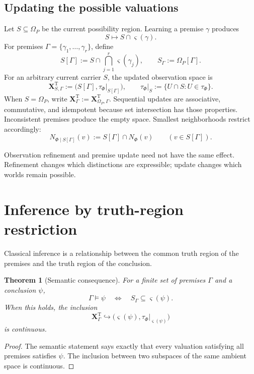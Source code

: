 \documentclass[11pt]{article}
\theoremstyle{definition}
\theoremstyle{plain}
\newtheorem{theorem}[definition]{Theorem}
\theoremstyle{remark}
\newcommand{\True}{\mathrm{T}}
\newcommand{\restr}{\mathord{|}}
\begin{document}
\subsection{Updating the possible valuations}

Let $S\subseteq\Omega_P$ be the current possibility region.  Learning a
premise $\gamma$ produces
\[
 S\longmapsto S\cap\varsigma(\gamma).
\]
For premises $\Gamma=\{\gamma_1,\ldots,\gamma_r\}$, define
\[
 S[\Gamma]:=S\cap\bigcap_{j=1}^r\varsigma(\gamma_j),
 \qquad
 S_\Gamma:=\Omega_P[\Gamma].
\]
For an arbitrary current carrier $S$, the updated observation space is
\[
 \mathbf X^\True_{S,\Gamma}
 :=\bigl(S[\Gamma],\tau_\Phi\restr_{S[\Gamma]}\bigr),
 \qquad
 \tau_\Phi\restr_S:=\{U\cap S:U\in\tau_\Phi\}.
\]
When $S=\Omega_P$, write
$\mathbf X^\True_\Gamma:=\mathbf X^\True_{\Omega_P,\Gamma}$.
Sequential updates are associative, commutative, and idempotent because set
intersection has those properties.  Inconsistent premises produce the empty
space.  Smallest neighborhoods restrict accordingly:
\[
 N_{\Phi\mid S[\Gamma]}(v):=S[\Gamma]\cap N_\Phi(v)
 \qquad(v\in S[\Gamma]).
\]

Observation refinement and premise update need not have the same effect.
Refinement changes which distinctions are expressible; update changes which
worlds remain possible.

\section{Inference by truth-region restriction}

Classical inference is a relationship between the common truth region of the
premises and the truth region of the conclusion.

\begin{theorem}[Semantic consequence]
For a finite set of premises $\Gamma$ and a conclusion $\psi$,
\[
 \Gamma\models\psi
 \quad\Longleftrightarrow\quad
 S_\Gamma\subseteq\varsigma(\psi).
\]
When this holds, the inclusion
\[
 \mathbf X^\True_\Gamma
 \hookrightarrow
 \bigl(\varsigma(\psi),
       \tau_\Phi\restr_{\varsigma(\psi)}\bigr)
\]
is continuous.
\end{theorem}

\begin{proof}
The semantic statement says exactly that every valuation satisfying all
premises satisfies $\psi$.  The inclusion between two subspaces of the same
ambient space is continuous.
\end{proof}
\end{document}
